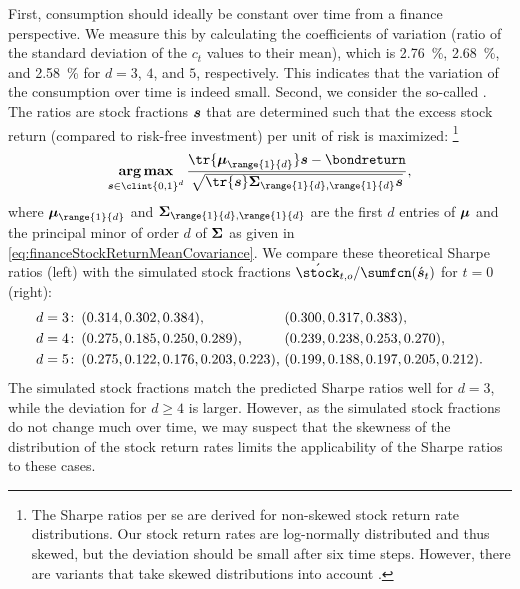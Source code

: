 First, consumption should ideally be constant over time
from a finance perspective.
We measure this by calculating the coefficients of variation
(ratio of the standard deviation of the $c_t$ values to their mean),
which is \SI{2.76}{\percent}, \SI{2.68}{\percent}, and \SI{2.58}{\percent}
for $d = 3$, $4$, and $5$, respectively.
This indicates that the variation of the consumption over time
is indeed small.
Second, we consider the so-called 
\cite{Sharpe66Mutual}.
The ratios are stock fractions ${\boldsymbol{s}}$ that are determined
such that the excess stock return (compared to risk-free investment)
per unit of risk is maximized:%
\footnote{%
  The Sharpe ratios per se are derived for non-skewed
  stock return rate distributions.
  Our stock return rates are log-normally distributed and thus skewed,
  but the deviation should be small after six time steps.
  However, there are variants that
  take skewed distributions into account \cite{Mueller15Ansaetze}.%
}
{%
  \setlength{\abovedisplayskip}{9pt}%
  \setlength{\belowdisplayskip}{9pt}%
  \begin{equation}
    \vecargmax_{\vstock \in \clint{0, 1}^d}
    \frac{
      \tr{\*\mu_{\range{1}{d}}} \vstock - \bondreturn
    }{
      \sqrt{\tr{\vstock} \mat{\Sigma}_{\range{1}{d},\range{1}{d}} \vstock}
    },
  \end{equation}%
}%
where $\*\mu_{\range{1}{d}}$ and
$\mat{\Sigma}_{\range{1}{d},\range{1}{d}}$
are the first $d$ entries of ${\boldsymbol{\mu}}$ and
the principal minor of order $d$ of ${\boldsymbol{\Sigma}}$ as given in
\cref{eq:financeStockReturnMeanCovariance}.
We compare these theoretical Sharpe ratios (left)
with the simulated stock fractions
$\acute{\stock}_{t,o}/\sumfcn(\acute{\vstock}_t)$ for $t = 0$ (right):
\begin{subequations}
  \setlength{\jot}{3pt}%
  \begin{align}
    d = 3\colon\,&
    (0.314, 0.302, 0.384\rlap{),}\hphantom{, 0.999, 0.999}\quad
    (0.300, 0.317, 0.383),\\
    d = 4\colon\,&
    (0.275, 0.185, 0.250, 0.289\rlap{),}\hphantom{, 0.999}\quad
    (0.239, 0.238, 0.253, 0.270),\\
    d = 5\colon\,&
    (0.275, 0.122, 0.176, 0.203, 0.223\rlap{),}\quad
    (0.199, 0.188, 0.197, 0.205, 0.212).
  \end{align}
\end{subequations}
The simulated stock fractions
match the predicted Sharpe ratios well for $d = 3$,
while the deviation for $d \ge 4$ is larger.
However, as the simulated stock fractions do not change much over time,
we may suspect that the skewness of the distribution of the stock return rates
limits the applicability of the Sharpe ratios to these cases.

